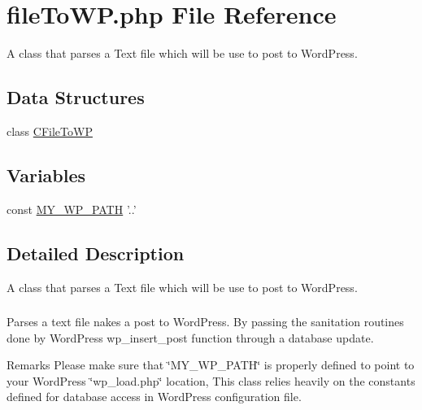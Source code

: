 \hypertarget{file_to_w_p_8php}{\section{file\+To\+W\+P.\+php File Reference}
\label{file_to_w_p_8php}
}


A class that parses a Text file which will be use to post to Word\+Press. \subsubsection*{} 


\subsection*{Data Structures}
\begin{DoxyCompactItemize}
\item 
class \hyperlink{class_c_file_to_w_p}{C\+File\+To\+W\+P}
\end{DoxyCompactItemize}
\subsection*{Variables}
\begin{DoxyCompactItemize}
\item 
const \hyperlink{file_to_w_p_8php_ab9655ee8f40d51ad76f2479000e8d41c}{M\+Y\+\_\+\+W\+P\+\_\+\+P\+A\+T\+H} '..'
\end{DoxyCompactItemize}


\subsection{Detailed Description}
A class that parses a Text file which will be use to post to Word\+Press. \subsubsection*{}



 



Parses a text file nakes a post to Word\+Press. By passing the sanitation routines done by Word\+Press wp\+\_\+insert\+\_\+post function through a database update. 

\begin{DoxyRemark}{Remarks}
Please make sure that \char`\"{}\+M\+Y\+\_\+\+W\+P\+\_\+\+P\+A\+T\+H\char`\"{} is properly defined to point to your Word\+Press \char`\"{}wp\+\_\+load.\+php\char`\"{} location, This class relies heavily on the constants defined for database access in Word\+Press configuration file.  
\end{DoxyRemark}


